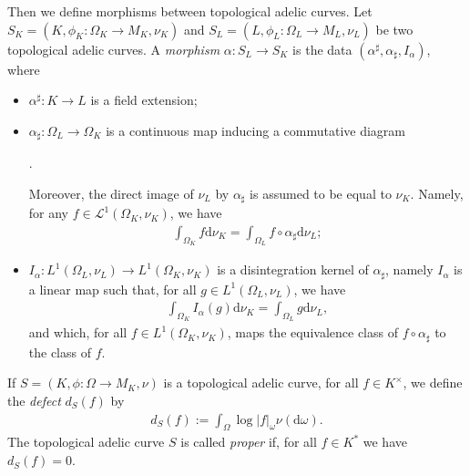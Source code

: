 \documentclass [11pt,reqno]{amsart}
\newcommand{\1}{\mathmybb{1}}
\def\cL{{\mathcal{L}}}
\def\diff{\mathrm{d}}
\begin{document}
\begin{definition}
Then we define morphisms between topological adelic curves. Let $S_K=(K,\phi_K:\Omega_K \to M_{K},\nu_K)$ and $S_L=(L,\phi_L:\Omega_L \to M_{L},\nu_L)$ be two topological adelic curves. A \emph{morphism} $\alpha : S_L \rightarrow S_K$ is the data $(\alpha^{\sharp},\alpha_{\sharp},I_\alpha)$, where
\begin{itemize}
	\item $\alpha^{\sharp} : K \rightarrow L$ is a field extension;
	\item $\alpha_{\sharp} : \Omega_L \rightarrow \Omega_K$ is a continuous map inducing a commutative diagram 
\begin{center}
.
\end{center}
Moreover, the direct image of $\nu_L$ by $\alpha_{\sharp}$ is assumed to be equal to $\nu_K$. Namely, for any $f\in \cL^{1}(\Omega_{K},\nu_K)$, we have
\begin{align*}
\int_{\Omega_K}f\diff\nu_K = \int_{\Omega_L} f\circ \alpha_{\sharp}\diff\nu_L;
\end{align*}
	\item $I_{\alpha} : L^1(\Omega_L,\nu_L) \rightarrow L^1(\Omega_K,\nu_K)$ is a disintegration kernel of $\alpha_{\sharp}$, namely $I_{\alpha}$ is a linear map such that, for all $g\in L^{1}(\Omega_L,\nu_L)$, we have
	\begin{align*}
	\int_{\Omega_K} I_{\alpha}(g)\diff\nu_K = \int_{\Omega_L} g\diff\nu_L,
	\end{align*}
and which, for all $f \in L^{1}(\Omega_K,\nu_K)$, maps the equivalence class of $f\circ \alpha_{\sharp}$ to the class of $f$.
\end{itemize}

If $S=(K,\phi: \Omega \to M_K,\nu)$ is a topological adelic curve, for all $f\in K^{\times}$, we define the \emph{defect} $d_S(f)$ by 
\begin{align*}
d_{S}(f) := \int_{\Omega} \log|f|_{\omega} \nu(\diff\omega).
\end{align*}  
The topological adelic curve $S$ is called \emph{proper} if, for all $f\in K^\ast$ we have $d_{S}(f)=0$.
\end{definition}
\end{document}
